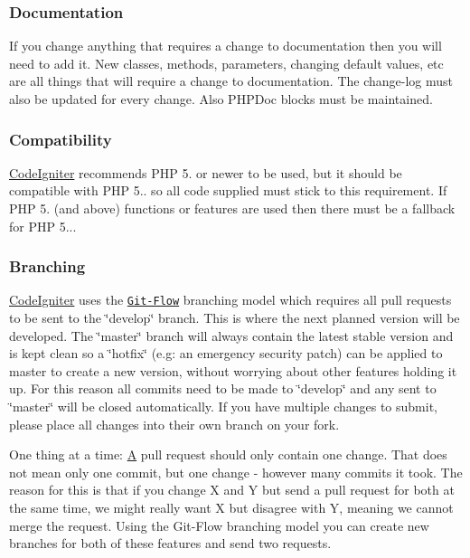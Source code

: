 \subsubsection*{Documentation}

If you change anything that requires a change to documentation then you will need to add it. New classes, methods, parameters, changing default values, etc are all things that will require a change to documentation. The change-\/log must also be updated for every change. Also P\+H\+P\+Doc blocks must be maintained.

\subsubsection*{Compatibility}

\mbox{\hyperlink{namespace_code_igniter}{Code\+Igniter}} recommends P\+HP 5. or newer to be used, but it should be compatible with P\+HP 5.. so all code supplied must stick to this requirement. If P\+HP 5. (and above) functions or features are used then there must be a fallback for P\+HP 5...

\subsubsection*{Branching}

\mbox{\hyperlink{namespace_code_igniter}{Code\+Igniter}} uses the \href{http://nvie.com/posts/a-successful-git-branching-model/}{\tt Git-\/\+Flow} branching model which requires all pull requests to be sent to the \char`\"{}develop\char`\"{} branch. This is where the next planned version will be developed. The \char`\"{}master\char`\"{} branch will always contain the latest stable version and is kept clean so a \char`\"{}hotfix\char`\"{} (e.\+g\+: an emergency security patch) can be applied to master to create a new version, without worrying about other features holding it up. For this reason all commits need to be made to \char`\"{}develop\char`\"{} and any sent to \char`\"{}master\char`\"{} will be closed automatically. If you have multiple changes to submit, please place all changes into their own branch on your fork.

One thing at a time\+: \mbox{\hyperlink{class_a}{A}} pull request should only contain one change. That does not mean only one commit, but one change -\/ however many commits it took. The reason for this is that if you change X and Y but send a pull request for both at the same time, we might really want X but disagree with Y, meaning we cannot merge the request. Using the Git-\/\+Flow branching model you can create new branches for both of these features and send two requests.

